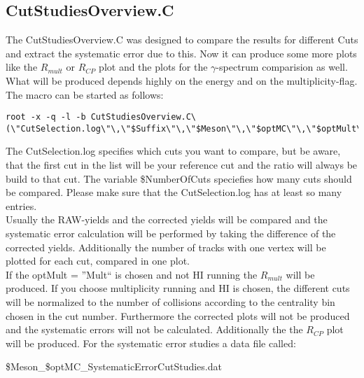 		\subsection{CutStudiesOverview.C}
		The CutStudiesOverview.C was designed to compare the results for different Cuts and extract the systematic error due to this. Now it can produce some more plots like the $R_{mult}$ or $R_{CP}$ plot and the plots for the $\gamma$-spectrum comparision as well. What will be produced depends highly on the energy and on the multiplicity-flag. The macro can be started as follows:
		\begin{lstlisting}
root -x -q -l -b CutStudiesOverview.C\(\"CutSelection.log\"\,\"$Suffix\"\,\"$Meson\"\,\"$optMC\"\,\"$optMult\"\,\"$optEn\"\,$NumberOfCuts\)		 
		\end{lstlisting}
		The CutSelection.log specifies which cuts you want to compare, but be aware, that the first cut in the list will be your reference cut and the ratio will always be build to that cut. The variable \$NumberOfCuts speciefies how many cuts should be compared. Please make sure that the CutSelection.log has at least so many entries. \\
		Usually the RAW-yields and the corrected yields will be compared and the systematic error calculation will be performed by taking the difference of the corrected yields. Additionally the number of tracks with one vertex will be plotted for each cut, compared in one plot.\\
		If the optMult = ''Mult`` is chosen and not HI running the $R_{mult}$ will be produced. If you choose multiplicity running and HI is chosen, the different cuts will be normalized to the number of collisions according to the centrality bin chosen in the cut number. Furthermore the corrected plots will not be produced and the systematic errors will not be calculated. Additionally the the $R_{CP}$ plot will be produced. 
		For the systematic error studies a data file called:
		\begin{center}
		 	\$Meson\_\$optMC\_SystematicErrorCutStudies.dat
		\end{center}
